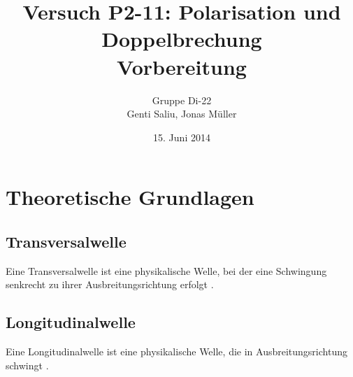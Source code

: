 \documentclass[a4paper,titlepage]{scrartcl}
\title{Versuch P2-11: Polarisation und Doppelbrechung\\Vorbereitung}
\author{Gruppe Di-22\\Genti Saliu, Jonas Müller}
\date{15. Juni 2014}
\numberwithin{equation}{section}
\begin{document}
	\begin{titlepage}
		\maketitle
		\thispagestyle{empty}
	\end{titlepage}
	
\newpage
{}
\tableofcontents

\newpage
{}

\section{Theoretische Grundlagen}

\subsection{Transversalwelle}
Eine Transversalwelle ist eine physikalische Welle, bei der eine Schwingung senkrecht zu ihrer Ausbreitungsrichtung erfolgt \cite{wiki:transversal}.

\subsection{Longitudinalwelle}
Eine Longitudinalwelle ist eine physikalische Welle, die in Ausbreitungsrichtung schwingt \cite{wiki:longitudinal}.
\end{document}
